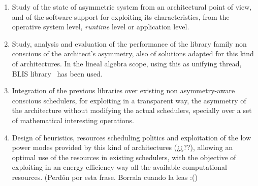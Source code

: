 \begin{enumerate}[T1.]

\item Study of the state of asymmetric system from an architectural point
  of view, and of the software support for exploiting its characteristics,
  from the operative system level, \emph{runtime} level or application level.

\item Study, analysis and evaluation of the performance of the library
  family non conscious of the architect's asymmetry, also of solutions
  adapted for this kind of architectures. In the lineal algebra scope,
  using this as unifying thread, BLIS library~\cite{BLIS1} has been used.

\item Integration of the previous libraries over existing non
  asymmetry-aware conscious schedulers, for exploiting in a transparent
  way, the asymmetry of the architecture without modifying the actual
  schedulers, specially over a set of mathematical interesting operations.

\item Design of heuristics, resources scheduling politics and exploitation
  of the low power modes provided by this kind of architectures (¿¿??),
  allowing an optimal use of the resources in existing schedulers, with the
  objective of exploiting in an energy efficiency way all the
  available computational resources. (Perdón por esta frase. Borrala cuando
  la leas :()



\end{enumerate}
